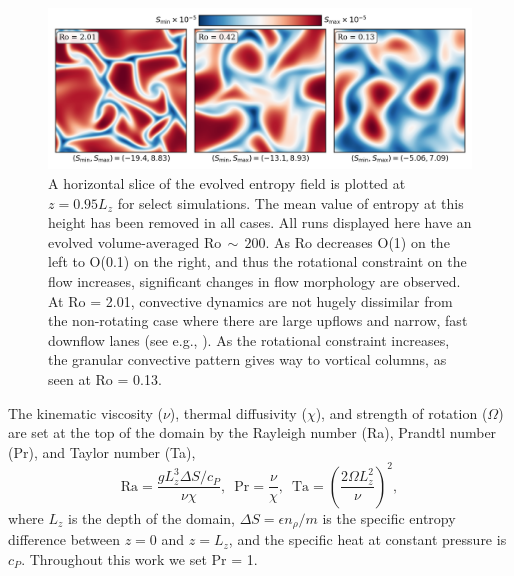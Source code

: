 \documentclass[twocolumn, amsmath, amsfonts, amssymb]{aastex62}
\begin{document}
\begin{figure}[t!]
\includegraphics[width=\textwidth]{./figs/dynamics_plot.png}
\caption{ A horizontal slice of the evolved entropy field is plotted at $z = 0.95L_z$
for select simulations. The mean value of entropy at this height has been removed in all
cases. All runs displayed here have an evolved volume-averaged Ro$\,\sim\,200$. 
As Ro decreases O(1) on the left to O(0.1) on the right, and thus the rotational
constraint on the flow increases, significant changes in flow morphology are observed.
At Ro = 2.01, convective dynamics are not hugely dissimilar from the non-rotating
case where there are large upflows and narrow, fast downflow lanes (see e.g., \AB).
As the rotational constraint increases, the granular convective pattern gives way
to vortical columns, as seen at Ro = 0.13.
\label{fig:pretty_convection} }
\end{figure}


The kinematic viscosity ($\nu$), thermal diffusivity ($\chi$), and strength of
rotation ($\Omega$) are set at the top of the domain by the Rayleigh number
(Ra), Prandtl number (Pr), and Taylor number (Ta),
\begin{equation}
\text{Ra} = \frac{g L_z^3 \Delta S / c_P}{\nu \chi}, \,\,\,
\text{Pr} = \frac{\nu}{\chi}, \,\,\,
\text{Ta} = \left(\frac{2 \Omega L_z^2}{\nu}\right)^2,
\end{equation}
where $L_z$ is the depth of the domain, 
$\Delta S = \epsilon n_\rho / m$ is the specific entropy difference between
$z = 0$ and $z = L_z$, and the specific heat at constant pressure is $c_P$.
Throughout this work we set Pr = 1.
\end{document}
